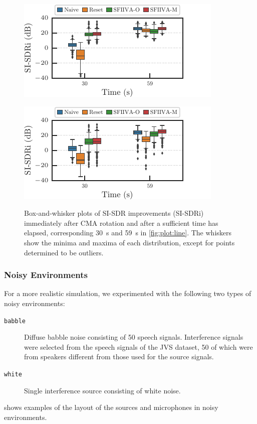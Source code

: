 \documentclass[sip,biber]{now-journal}
\begin{document}
\begin{figure}
  \begin{minipage}[t]{.45\textwidth}
    \centering\includegraphics{figures/plots/clean/box_980.pdf}\label{fig:plot:box:980}
  \end{minipage}
  \hspace{.05\textwidth}
  \begin{minipage}[t]{.45\textwidth}
    \centering\includegraphics{figures/plots/clean/box_990.pdf}\label{fig:plot:box:990}
  \end{minipage}
  \caption{%
    Box-and-whisker plots of SI-SDR improvements (SI-SDRi) immediately after CMA rotation and after a sufficient time has elapsed, corresponding \SI{30}{\second} and \SI{59}{\second} in \cref{fig:plot:line}.
    The whiskers show the minima and maxima of each distribution, except for points determined to be outliers.
  }%
  \label{fig:plot:box}
\end{figure}

\subsubsection{Noisy Environments}

For a more realistic simulation, we experimented with the following two types of noisy environments:
\begin{description}
  \item[\texttt{babble}] Diffuse babble noise consisting of 50 speech signals. Interference signals were selected from the speech signals of the JVS dataset, 50 of which were from speakers different from those used for the source signals.
  \item[\texttt{white}] Single interference source consisting of white noise.
\end{description}
 shows examples of the layout of the sources and microphones in noisy environments.
\end{document}
